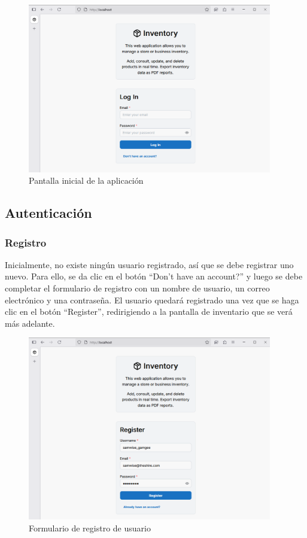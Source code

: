 \begin{figure}[H]
    \centering
    \includegraphics[width=0.95\textwidth]{images/1 Pantalla Inicial}
    \caption{Pantalla inicial de la aplicación}
\end{figure}

\subsection{Autenticación}

\subsubsection{Registro}

Inicialmente, no existe ningún usuario registrado, así que se debe registrar uno nuevo. Para ello, se da clic en el botón “Don't have an account?” y luego se debe completar el formulario de registro con un nombre de usuario, un correo electrónico y una contraseña. El usuario quedará registrado una vez que se haga clic en el botón “Register”, redirigiendo a la pantalla de inventario que se verá más adelante.

\begin{figure}[H]
    \centering
    \includegraphics[width=0.95\textwidth]{images/2 Registro}
    \caption{Formulario de registro de usuario}
\end{figure}

